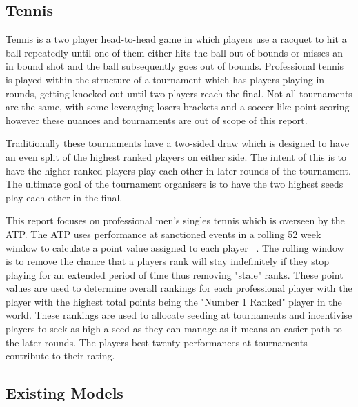 \documentclass[12pt,a4paper]{article}
\begin{document}
\subsection{Tennis}
Tennis is a two player head-to-head game in which players use a racquet to hit
a ball repeatedly until one of them either hits the ball out of bounds or misses
an in bound shot and the ball subsequently goes out of bounds. Professional tennis
is played within the structure of a tournament which has players playing in rounds,
getting knocked out until two players reach the final. Not all tournaments are
the same, with some leveraging losers brackets and a soccer like point scoring
however these nuances and tournaments are out of scope of this report.

Traditionally these tournaments have a two-sided draw which is designed to have
an even split of the highest ranked players on either side. The intent of this is
to have the higher ranked players play each other in later rounds of the tournament.
The ultimate goal of the tournament organisers is to have the two highest seeds
play each other in the final.

This report focuses on professional men's singles tennis which is overseen by
the ATP. The ATP uses performance at sanctioned events in a rolling 52 week
window to calculate a point value assigned to each player ~\cite{ATPTour2023}.
The rolling window is to remove the chance that a players rank will stay indefinitely
if they stop playing for an extended period of time thus removing "stale" ranks.
These point values are used to determine overall rankings for each professional
player with the player with the highest total points being the "Number 1 Ranked"
player in the world. These rankings are used to allocate seeding at tournaments
and incentivise players to seek as high a seed as they can manage as it means
an easier path to the later rounds. The players best twenty performances at tournaments
contribute to their rating.

\subsection{Existing Models}
\end{document}
